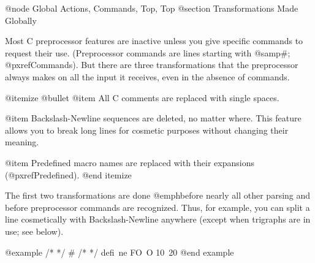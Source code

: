 @node Global Actions, Commands, Top, Top
@section Transformations Made Globally

Most C preprocessor features are inactive unless you give specific commands
to request their use.  (Preprocessor commands are lines starting with
@samp{#}; @pxref{Commands}).  But there are three transformations that the
preprocessor always makes on all the input it receives, even in the absence
of commands.

@itemize @bullet
@item
All C comments are replaced with single spaces.

@item
Backslash-Newline sequences are deleted, no matter where.  This
feature allows you to break long lines for cosmetic purposes without
changing their meaning.

@item
Predefined macro names are replaced with their expansions
(@pxref{Predefined}).
@end itemize

The first two transformations are done @emph{before} nearly all other parsing
and before preprocessor commands are recognized.  Thus, for example, you
can split a line cosmetically with Backslash-Newline anywhere (except
when trigraphs are in use; see below).

@example
/*
*/ # /*
*/ defi\
ne FO\
O 10\
20
@end example


